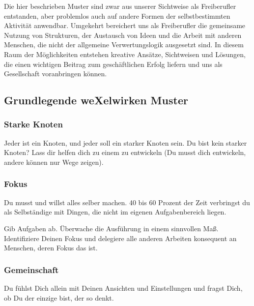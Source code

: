 {{Die hier beschrieben Muster sind zwar aus unserer Sichtweise als Freiberufler entstanden, aber problemlos auch auf andere Formen der selbstbestimmten Aktivität anwendbar. 
%
Umgekehrt bereichert uns als Freiberufler die gemeinsame Nutzung von Strukturen, der Austausch von Ideen und die Arbeit mit anderen Menschen, die nicht der allgemeine Verwertungslogik ausgesetzt sind.
%
In diesem Raum der Möglichkeiten entstehen kreative Ansätze, Sichtweisen und Lösungen, die einen wichtigen Beitrag zum geschäftlichen Erfolg liefern und uns als Gesellschaft voranbringen können.


\subsection{Grundlegende weXelwirken Muster}

\subsubsection{Starke Knoten}
Jeder ist ein Knoten, und jeder soll ein starker Knoten sein.
%
Du bist kein starker Knoten?
%
Lass dir helfen dich zu einem zu entwickeln (Du musst dich entwickeln, andere können nur Wege zeigen).

\subsubsection{Fokus}
\begin{em} Du musst und willst alles selber machen.
%
40 bis 60 Prozent der Zeit verbringst du als Selbständige mit Dingen, die nicht im eigenen Aufgabenbereich liegen.
\end{em}



Gib Aufgaben ab.
%
Überwache die Ausführung in einem sinnvollen Maß.
%
Identifiziere Deinen Fokus und delegiere alle anderen Arbeiten konsequent an Menschen, deren Fokus das ist.

\subsubsection{Gemeinschaft}
\begin{em} Du fühlst Dich allein mit Deinen Ansichten und Einstellungen und fragst Dich, ob Du der einzige bist, 
der so denkt. \end{em}



}}
